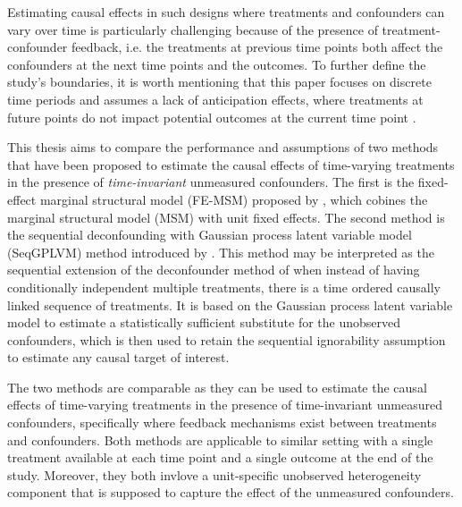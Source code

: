 Estimating causal effects in such designs where 
treatments and confounders can vary over time is particularly challenging 
because of the presence of treatment-confounder feedback, i.e.
the treatments at previous time points both affect the confounders at the next time points 
and the outcomes. To further define the study's boundaries, it is worth mentioning 
that this paper focuses on discrete time periods\cite{gillCausalInferenceComplex2001} and assumes a lack of anticipation effects, 
where treatments at future points do not impact potential outcomes at the current time point \cite{leeFindingDynamicTreatment2012}.

This thesis aims to compare the performance and assumptions of two methods that have been 
proposed to estimate the causal effects of time-varying treatments 
in the presence of \emph{time-invariant} unmeasured confounders. The first is the fixed-effect
marginal structural model (FE-MSM) proposed by \cite{blackwellEffectPoliticalAdvertising2024}, 
which cobines the marginal structural model (MSM) \cite{robinsMarginalStructuralModels2000} 
with unit fixed effects. The second method is the 
sequential deconfounding with Gaussian process latent variable model (SeqGPLVM) 
method introduced by \cite{hattSequentialDeconfoundingCausal2024}. This method may be interpreted as the 
sequential extension of the deconfounder method of \cite{wangBlessingsMultipleCauses2019} when 
instead of having conditionally independent multiple treatments, there is a time ordered causally linked 
sequence of treatments. It is based on the Gaussian process latent variable model \cite{lawrenceGaussianProcessLatent2003} 
to estimate a statistically sufficient substitute for the unobserved confounders, 
which is then used to retain the sequential ignorability assumption to estimate any causal target of interest. 

The two methods are comparable as they can be used to estimate the 
causal effects of time-varying treatments in the presence of time-invariant 
unmeasured confounders, specifically where feedback mechanisms exist 
between treatments and confounders. 
Both methods are applicable to similar setting with  
a single treatment available at each time point and a single outcome at the end of the study.
Moreover, they both invlove a unit-specific unobserved heterogeneity component that 
is supposed to capture the effect of the
unmeasured confounders. 


